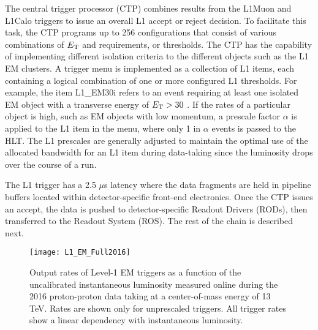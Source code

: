 The central trigger processor (CTP) combines results from the L1Muon and L1Calo
triggers to issue an overall L1 accept or reject decision.
To facilitate this task, the CTP programs up to 256 configurations that 
consist of various combinations of $E_{\rm{T}}$ and \pt requirements, 
or thresholds.
The CTP has the capability of implementing different isolation criteria 
to the different objects such as the L1 EM clusters. 
A trigger menu is implemented as a collection of L1 items, each containing a 
logical combination of one or more configured L1 thresholds. 
For example, the item L1\_EM30i refers to an event requiring at least one 
isolated EM object with a transverse energy of $E_{\rm{T}} > 30$ \GeV. 
If the rates of a particular 
object is high, such as EM objects with low momentum, a prescale factor $\alpha$ is applied to the L1 item in the menu, where only 1 in $\alpha$
events is passed to the HLT. The L1 prescales are generally adjusted to 
maintain the optimal use of the allocated bandwidth for an L1 item during 
data-taking since the luminosity drops over the course of a run.

The L1 trigger has a 2.5 $\mu$s latency where the data fragments are 
held in pipeline buffers located within detector-specific front-end 
electronics. 
Once the CTP issues an accept, the data is pushed to detector-specific 
Readout Drivers (RODs), then transferred to the Readout System (ROS). 
The rest of the chain is described next. 

\begin{figure}[t!]
\centering
\texttt{[image: L1\_EM\_Full2016]}
\caption{Output rates of Level-1 EM triggers as a function of the uncalibrated instantaneous luminosity measured online during the 2016 proton-proton data taking at a center-of-mass energy of 13 TeV.
Rates are shown only for unprescaled triggers. All trigger rates show a linear dependency with instantaneous luminosity.}
\label{fig:}
\end{figure} 




